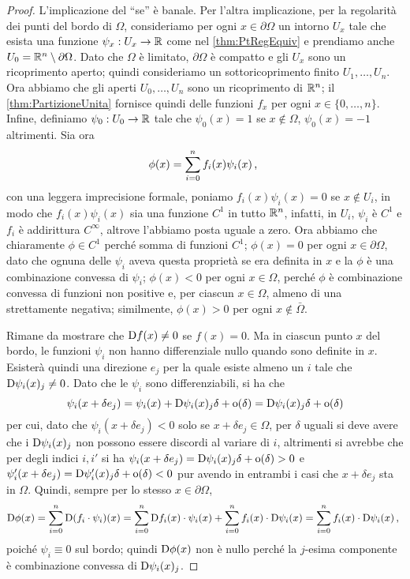 \begin{proof}
	L'implicazione del ``se'' è banale. Per l'altra implicazione, per la regolarità dei punti del bordo di $\Omega$, consideriamo per ogni
	$x\in\partial \Omega$ un intorno $U_x$ tale che esista una funzione $\psi_x:U_x\rightarrow \mathbb R$ come nel \cref{thm:PtRegEquiv} e prendiamo
	anche $U_0 = \mathbb R^n \setminus \partial \Omega$. Dato che $\Omega$ è limitato, $\partial\Omega$ è compatto e gli $U_x$ sono un ricoprimento
	aperto; quindi consideriamo un sottoricoprimento finito $U_1, \dots, U_n$. Ora abbiamo che gli aperti $U_0,\dots,U_n$ sono un ricoprimento
	di $\mathbb R^n$; il \cref{thm:PartizioneUnita} fornisce quindi delle funzioni $f_x$ per ogni $x\in\{0,\dots, n\}$.
	Infine, definiamo $\psi_0:U_0\rightarrow \mathbb R$ tale che $\psi_0(x)=1$ se $x\notin \Omega$, $\psi_0(x)=-1$ altrimenti. Sia ora 
	\[
		\phi(x)=\sum_{i=0}^n f_i(x) \psi_i(x)\, \text{, }
	\]
	con una leggera imprecisione formale, poniamo $f_i(x) \psi_i(x) = 0$ se $x\notin U_i$, in modo che $f_i(x) \psi_i(x)$ sia una funzione
	$C^1$ in tutto $\mathbb R^n$, infatti, in $U_i$, $\psi_i$ è $C^1$ e $f_i$ è addirittura $C^{\infty}$, altrove l'abbiamo posta uguale a zero.
	Ora abbiamo che chiaramente $\phi\in C^1$ perché somma di funzioni $C^1$; $\phi(x)=0$ per ogni $x\in \partial\Omega$, dato che ognuna delle
	$\psi_i$ aveva questa proprietà se era definita in $x$ e la $\phi$ è una combinazione convessa di $\psi_i$;
	$\phi(x)<0$ per ogni $x \in \Omega$, perché $\phi$ è combinazione convessa di funzioni non positive e, per ciascun $x \in \Omega$,
	almeno di una strettamente negativa; similmente, $\phi(x)>0$ per ogni $x \notin \bar{\Omega}$.
	
	Rimane da mostrare che $\mathrm D f(x)\neq 0$ se $f(x)=0$. Ma in ciascun punto $x$ del bordo, le funzioni $\psi_i$ non hanno differenziale nullo quando
	sono definite in $x$. Esisterà quindi una direzione $e_j$ per la quale esiste almeno un $i$ tale che $\mathrm D \psi_i(x)_j\neq 0$. Dato che le $\psi_i$
	sono differenziabili, si ha che
	\[
		\psi_i(x+\delta e_j)=\psi_i(x)+\mathrm D \psi_i(x)_j \delta + \mathrm{o}(\delta) = \mathrm D \psi_i(x)_j \delta + \mathrm{o}(\delta)
	\]
	per cui, dato che $\psi_i(x+\delta e_j)<0$ solo se $x+\delta e_j\in \Omega$, per $\delta$ uguali si deve avere che i $\mathrm D \psi_i(x)_j$ non possono
	essere discordi al variare di $i$, altrimenti si avrebbe che per degli indici $i,i'$ si ha $\psi_i(x+\delta e_j)=
	\mathrm D \psi_i(x)_j \delta + \mathrm{o}(\delta)>0$ e $\psi_i'(x+\delta e_j)=\mathrm D \psi_i'(x)_j \delta + \mathrm{o}(\delta)<0$ pur avendo in entrambi i casi
	che $x+\delta e_j$ sta in $\Omega$. Quindi, sempre per lo stesso $x\in\partial \Omega$,
	\[ 
		\mathrm D \phi(x)=\sum_{i=0}^n \mathrm D (f_i \cdot\psi_i)(x)=\sum_{i=0}^n \mathrm D f_i(x)\cdot \psi_i(x)+\sum_{i=0}^n f_i(x)\cdot \mathrm D  \psi_i(x)=
		\sum_{i=0}^n f_i(x)\cdot \mathrm D  \psi_i(x)\, \text{, }
	\]
	poiché $\psi_i\equiv 0$ sul bordo; quindi $\mathrm D \phi(x)$ non è nullo perché la $j$-esima componente è combinazione convessa di $\mathrm D \psi_i(x)_j$.
\end{proof}


